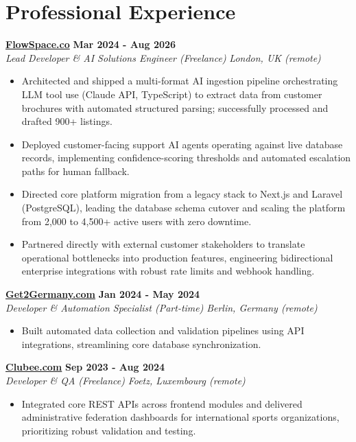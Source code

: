 \documentclass[a4paper,10pt]{article}
\newcommand{\role}[4]{%
  \textbf{#1} \hfill \textbf{#2}\\[1pt]%
  \textit{#3} \hfill \textit{#4}\\[2pt]%
}
\begin{document}
\section{Professional Experience}

\role{\href{https://flowspace.co}{FlowSpace.co}}{Mar 2024 - Aug 2026}{Lead Developer \& AI Solutions Engineer (Freelance)}{London, UK (remote)}
\begin{itemize}
  \item Architected and shipped a multi-format AI ingestion pipeline orchestrating LLM tool use (Claude API, TypeScript) to extract data from customer brochures with automated structured parsing; successfully processed and drafted 900+ listings.
  \item Deployed customer-facing support AI agents operating against live database records, implementing confidence-scoring thresholds and automated escalation paths for human fallback.
  \item Directed core platform migration from a legacy stack to Next.js and Laravel (PostgreSQL), leading the database schema cutover and scaling the platform from 2,000 to 4,500+ active users with zero downtime.
  \item Partnered directly with external customer stakeholders to translate operational bottlenecks into production features, engineering bidirectional enterprise integrations with robust rate limits and webhook handling.
\end{itemize}

\role{\href{https://get2germany.com}{Get2Germany.com}}{Jan 2024 - May 2024}{Developer \& Automation Specialist (Part-time)}{Berlin, Germany (remote)}
\begin{itemize}
  \item Built automated data collection and validation pipelines using API integrations, streamlining core database synchronization.
\end{itemize}

\role{\href{https://clubee.com}{Clubee.com}}{Sep 2023 - Aug 2024}{Developer \& QA (Freelance)}{Foetz, Luxembourg (remote)}
\begin{itemize}
  \item Integrated core REST APIs across frontend modules and delivered administrative federation dashboards for international sports organizations, prioritizing robust validation and testing.
\end{itemize}

\end{document}
